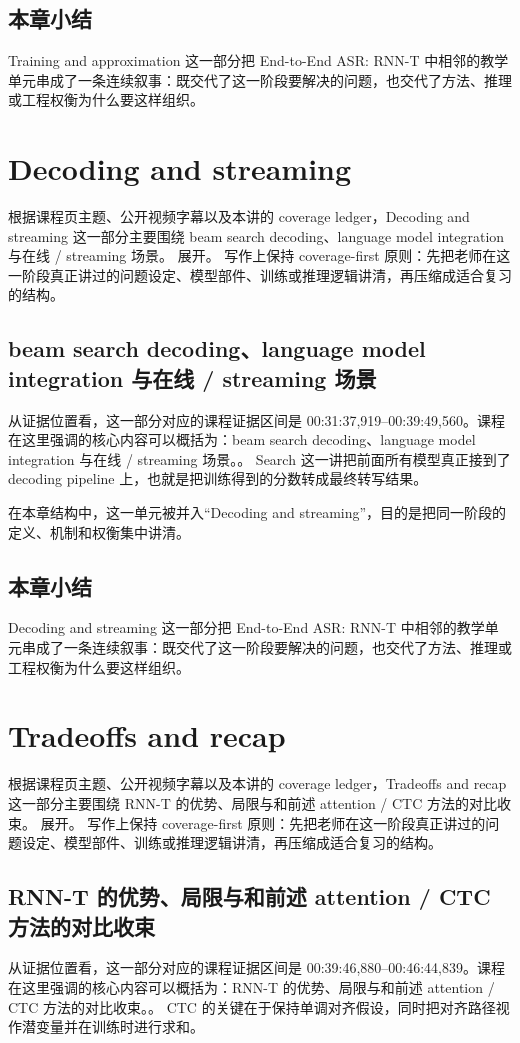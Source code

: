 \documentclass[a4paper]{article}
\begin{document}
\subsection{本章小结}
Training and approximation 这一部分把 End-to-End ASR: RNN-T 中相邻的教学单元串成了一条连续叙事：既交代了这一阶段要解决的问题，也交代了方法、推理或工程权衡为什么要这样组织。

\section{Decoding and streaming}
根据课程页主题、公开视频字幕以及本讲的 coverage ledger，Decoding and streaming 这一部分主要围绕 beam search decoding、language model integration 与在线 / streaming 场景。 展开。
写作上保持 coverage-first 原则：先把老师在这一阶段真正讲过的问题设定、模型部件、训练或推理逻辑讲清，再压缩成适合复习的结构。

\subsection{beam search decoding、language model integration 与在线 / streaming 场景}
从证据位置看，这一部分对应的课程证据区间是 00:31:37,919--00:39:49,560。课程在这里强调的核心内容可以概括为：beam search decoding、language model integration 与在线 / streaming 场景。。
Search 这一讲把前面所有模型真正接到了 decoding pipeline 上，也就是把训练得到的分数转成最终转写结果。

在本章结构中，这一单元被并入“Decoding and streaming”，目的是把同一阶段的定义、机制和权衡集中讲清。

\subsection{本章小结}
Decoding and streaming 这一部分把 End-to-End ASR: RNN-T 中相邻的教学单元串成了一条连续叙事：既交代了这一阶段要解决的问题，也交代了方法、推理或工程权衡为什么要这样组织。

\section{Tradeoffs and recap}
根据课程页主题、公开视频字幕以及本讲的 coverage ledger，Tradeoffs and recap 这一部分主要围绕 RNN-T 的优势、局限与和前述 attention / CTC 方法的对比收束。 展开。
写作上保持 coverage-first 原则：先把老师在这一阶段真正讲过的问题设定、模型部件、训练或推理逻辑讲清，再压缩成适合复习的结构。

\subsection{RNN-T 的优势、局限与和前述 attention / CTC 方法的对比收束}
从证据位置看，这一部分对应的课程证据区间是 00:39:46,880--00:46:44,839。课程在这里强调的核心内容可以概括为：RNN-T 的优势、局限与和前述 attention / CTC 方法的对比收束。。
CTC 的关键在于保持单调对齐假设，同时把对齐路径视作潜变量并在训练时进行求和。
\end{document}
